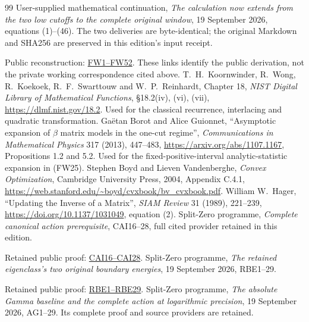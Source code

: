\documentclass[11pt]{article}
\begin{document}
\begin{thebibliography}{99}
 User-supplied mathematical continuation,
\emph{The calculation now extends from the two low cutoffs to the complete
original window}, 19 September 2026, equations (1)--(46).
The two deliveries are byte-identical; the original Markdown and SHA256
are preserved in this edition's input receipt.

Public reconstruction: \href{https://github.com/KokunoYumeto/zeta-function-research-reader/blob/689a8f87e9c12b7a99b01b3123438c6751ee608f/workbenches/splitzero-tandem/continuations/20260919-full-window-source-products/FULL_WINDOW_SOURCE_PRODUCTS.tex\#L28}{FW1--FW52}. These links identify the public derivation, not the private working correspondence cited above.
 T.~H.~Koornwinder, R.~Wong, R.~Koekoek,
R.~F.~Swarttouw and W.~P.~Reinhardt, Chapter 18,
\emph{NIST Digital Library of Mathematical Functions},
\S18.2(iv), (vi), (vii), \url{https://dlmf.nist.gov/18.2}.
Used for the classical recurrence, interlacing and quadratic transformation.
 Ga\"etan Borot and Alice Guionnet,
``Asymptotic expansion of $\beta$ matrix models in the one-cut regime'',
\emph{Communications in Mathematical Physics} 317 (2013), 447--483,
\url{https://arxiv.org/abs/1107.1167}, Propositions 1.2 and 5.2.
Used for the fixed-positive-interval analytic-statistic expansion in (FW25).
 Stephen Boyd and Lieven Vandenberghe,
\emph{Convex Optimization}, Cambridge University Press, 2004,
Appendix C.4.1, \url{https://web.stanford.edu/~boyd/cvxbook/bv_cvxbook.pdf}.
 William W.~Hager, ``Updating the Inverse of a Matrix'',
\emph{SIAM Review} 31 (1989), 221--239,
\url{https://doi.org/10.1137/1031049}, equation (2).
 Split-Zero programme, \emph{Complete canonical action
prerequisite}, CAI16--28, full cited provider retained in this edition.

Retained public proof: \href{https://github.com/KokunoYumeto/zeta-function-research-reader/blob/689a8f87e9c12b7a99b01b3123438c6751ee608f/workbenches/splitzero-tandem/continuations/20260919-full-window-source-products/providers/CAI_COMPLETE_PREREQUISITE.tex\#L284}{CAI16--CAI28}.
 Split-Zero programme, \emph{The retained eigenclass's two
original boundary energies}, 19 September 2026, RBE1--29.

Retained public proof: \href{https://github.com/KokunoYumeto/zeta-function-research-reader/blob/689a8f87e9c12b7a99b01b3123438c6751ee608f/workbenches/splitzero-tandem/continuations/20260919-full-window-source-products/providers/RETAINED_CLASS_BOUNDARY_ENERGIES.tex\#L45}{RBE1--RBE29}.
 Split-Zero programme, \emph{The absolute Gamma baseline and
the complete action at logarithmic precision}, 19 September 2026,
AG1--29. Its complete proof and source providers are retained.


\end{thebibliography}
\end{document}

